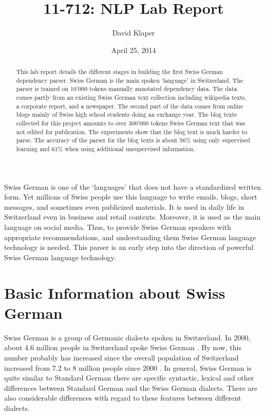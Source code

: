 \documentclass[11pt,letterpaper, covington]{article}
\title{11-712:  NLP Lab Report}
\author{David Klaper}
\date{April 25, 2014}
\begin{document}
\maketitle
\begin{abstract}
This lab report details the different stages in building the first Swiss German dependency parser. Swiss German is the main spoken `language' in Switzerland. The parser is trained on 10'000 tokens manually annotated dependency data. The data comes partly from an existing Swiss German text collection including wikipedia texts, a corporate report, and a newspaper. The second part of the data comes from online blogs mainly of Swiss high school students doing an exchange year. The blog texts collected for this project amounts to over 300'000 tokens Swiss German text that was not edited for publication. The experiments show that the blog text is much harder to parse. The accuracy of the parser for the blog texts is about 56\% using only supervised learning and 61\% when using additional unsupervised information.
\end{abstract}

Swiss German is one of the `languages' that does not have a standardized written form. Yet millions of Swiss people use this language to write emails, blogs, short messages, and sometimes even publicized materials. It is used in daily life in Switzerland even in business and retail contexts. Moreover, it is used as the main language on social media. Thus, to provide Swiss German speakers with appropriate recommendations, and understanding them Swiss German language technology is needed. This parser is an early step into the direction of powerful Swiss German language technology.

\section{Basic Information about Swiss German}

Swiss German is a group of Germanic dialects spoken in Switzerland. In 2000, about 4.6 million people in Switzerland spoke Swiss German \citep{LGC13}. By now, this number probably has increased since the overall population of Switzerland increased from 7.2 to 8 million people since 2000 \citep{BFS13}. In general, Swiss German is quite similar to Standard German there are specific syntactic, lexical and other differences between Standard German and the Swiss German dialects. There are also considerable differences with regard to these features between different dialects. \citep{Scherrer11}
\end{document}
